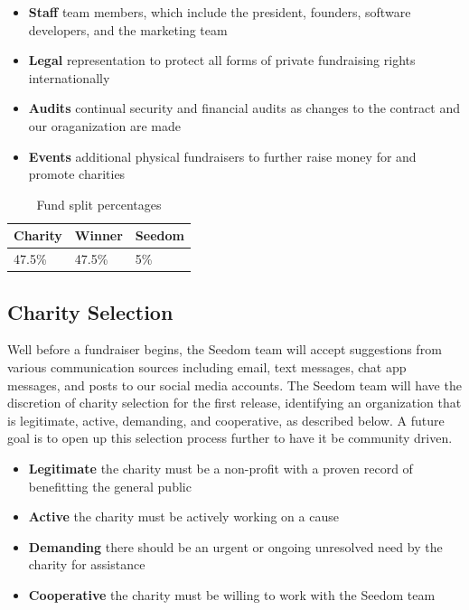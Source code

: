 \documentclass[11pt]{article}
\begin{document}
\begin{itemize}
\item{\textbf{Staff} team members, which include the president, founders, software developers, and the marketing team}
\item{\textbf{Legal} representation to protect all forms of private fundraising rights internationally}
\item{\textbf{Audits} continual security and financial audits as changes to the contract and our oraganization are made}
\item{\textbf{Events} additional physical fundraisers to further raise money for and promote charities}
\end{itemize}

\begin{table}[H]
\begin{center}
\begin{tabular}{| l | l | l |}
\hline
\textbf{Charity} & \textbf{Winner} & \textbf{Seedom} \\ \hline
47.5\% & 47.5\%  & 5\% \\ \hline
\end{tabular}
\caption{Fund split percentages}
\label{tab:fundSplitPercentages}
\end{center}
\end{table}

\subsection{Charity Selection}

Well before a fundraiser begins, the Seedom team will accept suggestions from various communication sources including email, text messages, chat app messages, and posts to our social media accounts. The Seedom team will have the discretion of charity selection for the first release, identifying an organization that is legitimate, active, demanding, and cooperative, as described below. A future goal is to open up this selection process further to have it be community driven.

\begin{itemize}
\item{\textbf{Legitimate} the charity must be a non-profit with a proven record of benefitting the general public}
\item{\textbf{Active} the charity must be actively working on a cause}
\item{\textbf{Demanding} there should be an urgent or ongoing unresolved need by the charity for assistance}
\item{\textbf{Cooperative} the charity must be willing to work with the Seedom team}
\end{itemize}
\end{document}
